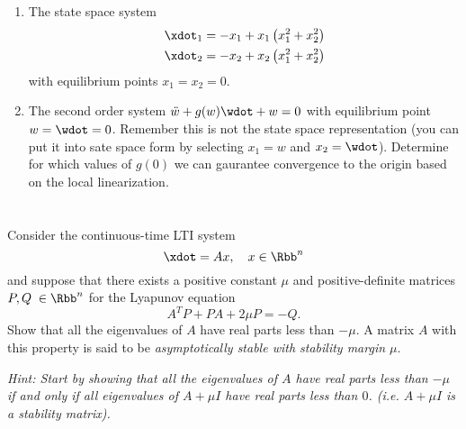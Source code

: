 \documentclass[10pt]{article}
\begin{document}
\begin{enumerate}[label=(\alph*)]
\item The state space system 
  \begin{equation*}
    \begin{split}
      \xdot_1 &= -x_1 + x_1\left(x_1^2 + x_2^2\right)\\
      \xdot_2 &= -x_2 + x_2\left(x_1^2 + x_2^2\right)
    \end{split}
  \end{equation*}
with equilibrium points $x_1 = x_2 = 0$.
\item The second order system $\ddot{w} + g(w)\wdot + w = 0$ with
  equilibrium point $w = \wdot = 0$. Remember this is not the state
  space representation (you can put it into sate space form by
  selecting $x_1 = w$ and $x_2 = \wdot$). Determine for which values
  of $g(0)$ we can gaurantee convergence to the origin based on the
  local linearization.
\end{enumerate}

\section{}
Consider the continuous-time LTI system
\begin{equation*}
  \xdot = Ax, \quad x \in \Rbb^n
\end{equation*}
and suppose that there exists a positive constant $\mu$ and
positive-definite matrices $P,Q \; \in \Rbb^n$ for the Lyapunov
equation
\begin{equation*}
  A^TP + PA + 2\mu P = -Q.
\end{equation*}
Show that all the eigenvalues of $A$ have real parts less than
$-\mu$. A matrix $A$ with this property is said to be
\emph{asymptotically stable with stability margin $\mu$}.

\emph{Hint: Start by showing that all the eigenvalues of $A$ have real
  parts less than $-\mu$ if and only if all eigenvalues of $A+\mu I$
  have real parts less than $0$. (i.e. $A+\mu I$ is a stability
  matrix). }
\end{document}
